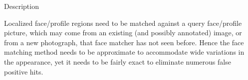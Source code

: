 

\begin{xpsectionbox}{Description}{}

Localized face/profile regions  need to be matched against a query face/profile picture, which may come from an existing (and possibly annotated) image, or from a new photograph, that face matcher has not seen before. Hence the face matching method needs to be approximate to accommodate wide variations in the appearance, yet it needs to be fairly exact to eliminate numerous false positive hits.

%
%
%
\end{xpsectionbox}

%
%

